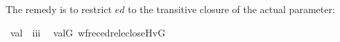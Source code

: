 The remedy is to restrict $\mathit{ed}$ to the
transitive closure of the actual parameter:
\begin{isabelle}
\isamarkupfalse%
\isanewline
\ val\ {\isacharcolon}{\isacharcolon}\ {\isachardoublequoteopen}i{\isasymRightarrow}i{\isasymRightarrow}i{\isachardoublequoteclose}\ \isanewline
\ {\isachardoublequoteopen}val{\isacharparenleft}G{\isacharcomma}{\isasymtau}{\isacharparenright}{\isacharequal}{\isacharequal}\ wfrec{\isacharparenleft}edrel{\isacharparenleft}eclose{\isacharparenleft}{\isacharbraceleft}{\isasymtau}{\isacharbraceright}{\isacharparenright}{\isacharparenright}{\isacharcomma}{\isasymtau}{\isacharcomma}Hv{\isacharparenleft}G{\isacharparenright}{\isacharparenright}{\isachardoublequoteclose}
\end{isabelle}

